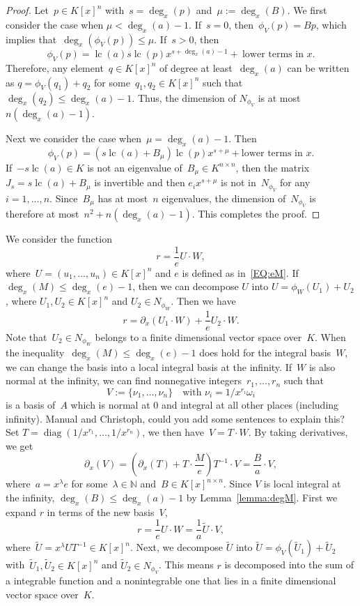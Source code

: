 \documentclass{sig-alternate}
\newtheorem{remark}[theorem]{Remark}
\newcommand{\red}{\color{red}}
\newcommand{\bN}{ {\mathbb N}}
\def\lc{\operatorname{lc}}
\def\diag{\operatorname{diag}}
\begin{document}
\begin{proof} Let~$p\in K[x]^n$ with~$s=\deg_x(p)$ and~$\mu := \deg_x(B)$.
We first consider the case when $\mu <\deg_x(a)-1$.
If~$s=0$, then~$\phi_V(p) = B p$,
which implies that~$\deg_x(\phi_V(p))\leq \mu$. If~$s>0$, then
\[\phi_V(p)=\lc(a)s\lc(p)x^{s+\deg_x(a)-1} +~ \text{lower terms in~$x$}.\]
Therefore, any element~$q\in K[x]^n$ of degree at least~$\deg_x(a)$ can be written as
$q = \phi_V(q_1) + q_2$ for some~$q_1, q_2\in K[x]^n$ such that~$\deg_x(q_2)\leq \deg_x(a)-1$.
Thus, the dimension of $N_{\phi_V}$ is at most $n (\deg_x(a)-1)$.

Next we consider the case when~$\mu =\deg_x(a)-1$. Then
\[\phi_V(p) = (s\lc(a) + B_{\mu})\lc(p)x^{s+\mu}+\text{lower terms in~$x$}.\]
If~$-s\lc(a)\in K$ is not an eigenvalue of~$B_{\mu}\in K^{n\times n}$, then
the matrix~$J_s = s\lc(a) + B_{\mu}$ is invertible and then $e_ix^{s+\mu}$ is not in~$N_{\phi_V}$
for any~$i=1, \ldots, n$. Since~$B_\mu$ has at most~$n$ eigenvalues, the dimension of~$N_{\phi_V}$
is therefore at most~$n^2+n(\deg_x(a)-1)$. This completes the proof.
\end{proof}

We consider the function
\[r = \frac{1}{e}U\cdot W,\]
where~$U = (u_1, \ldots, u_n) \in K[x]^n$ and $e$ is defined as in~\eqref{EQ:eM}.
If $\deg_x(M) \leq  \deg_x(e)-1$, then we can decompose $U$ into $U = \phi_W(U_1) + U_2$, where $U_1, U_2\in K[x]^n$
and $U_2\in N_{\phi_W}$. Then we have
\[r = \partial_x(U_1\cdot W) + \frac{1}{e} U_2 \cdot W. \]
Note that~$U_2\in N_{\phi_W}$ belongs to a finite dimensional vector space over~$K$.
When the inequality~$\deg_x(M)\leq \deg_x(e)-1$ does hold
for the integral basis~$W$, we can
change the basis into a local integral basis at the infinity. If~$W$ is also normal at the infinity,
we can find nonnegative integers~$r_1, \ldots, r_n$ such that
\[ V := \{\nu_1, \ldots, \nu_n\} \quad \text{with $\nu_i = 1/x^{r_i} \omega_i$}\]
is a basis of~$A$ which is normal at $0$ and integral at all other places (including infinity).
{\red Manual and Christoph, could you add some sentences to explain this?}
Set $T = \diag(1/x^{r_1}, \ldots, 1/x^{r_n})$, we then have~$V = T\cdot W$.
By taking derivatives, we get
\[\partial_x(V) = \left(\partial_x(T) + T\cdot \frac{M}{e}\right)T^{-1} \cdot  V = \frac{B}{a} \cdot V, \]
where~$a=x^\lambda e$ for some~$\lambda\in \bN$ and~$B\in K[x]^{n\times n}$. Since $V$ is local integral
at the infinity, $\deg_x(B) \leq \deg_x(a)-1$ by Lemma~\ref{lemma:degM}.
First we expand $r$ in terms of the new basis~$V$,
\[r = \frac{1}{e} U \cdot W = \frac{1}{a} \tilde{U}\cdot V, \]
where~$\tilde{U} = x^\lambda U T^{-1} \in K[x]^n$. Next, we decompose $\tilde{U}$ into
$\tilde{U} = \phi_{V}(\tilde{U}_1) + \tilde{U}_2$ with~$\tilde{U}_1, \tilde{U}_2\in K[x]^n$ and
$\tilde{U}_2\in N_{\phi_V}$. This means $r$ is decomposed into the sum of a integrable function
and a nonintegrable one that lies in a finite dimensional vector space over~$K$.
\end{document}
